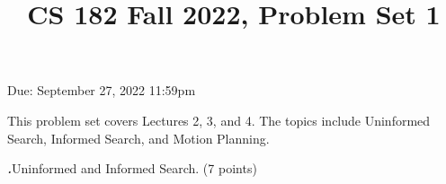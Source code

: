 \documentclass[12pt]{amsart}
\title{CS 182 Fall 2022, Problem Set 1}
\newenvironment{statement}[1]{\smallskip\noindent\color[rgb]{0.0,0.0,0.0} {\bf #1.}}{}
\theoremstyle{definition}
\theoremstyle{remark}
\newcommand{\1}{\mathds{1}}
\begin{document}
\maketitle

\vspace*{-0.25in}
\centerline{Due: September 27, 2022 11:59pm}

\begin{center}
\end{center}
\vspace*{0.15in}

\noindent This problem set covers Lectures 2, 3, and 4. The topics include Uninformed Search, Informed Search, and Motion Planning.
\vspace*{0.35in}

\begin{statement}{1}
\textit{Uninformed and Informed Search.} (7 points)


\end{statement}
\end{document}
